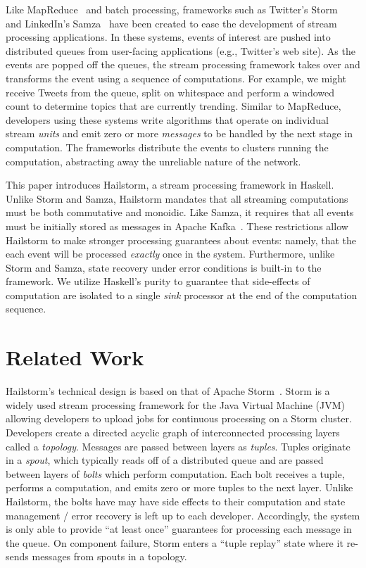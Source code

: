 \documentclass[10pt,nocopyrightspace]{sigplanconf}
\begin{document}
Like MapReduce~\cite{mapreduce} and batch processing, frameworks such as
Twitter's Storm~\cite{storm} and LinkedIn's Samza~\cite{samza} have been
created to ease the development of stream processing applications. In these
systems, events of interest are pushed into distributed queues from user-facing
applications (e.g., Twitter's web site).  As the events are popped off the
queues, the stream processing framework takes over and transforms the event
using a sequence of computations. For example, we might receive Tweets from the
queue, split on whitespace and perform a windowed count to determine topics
that are currently trending. Similar to MapReduce, developers using these
systems write algorithms that operate on individual stream \textit{units} and
emit zero or more \textit{messages} to be handled by the next stage in
computation. The frameworks distribute the events to clusters running the
computation, abstracting away the unreliable nature of the network.

This paper introduces Hailstorm, a stream processing framework in Haskell.
Unlike Storm and Samza, Hailstorm mandates that all streaming computations must
be both commutative and monoidic. Like Samza, it requires that all events must
be initially stored as messages in Apache Kafka~\cite{kafka}.  These
restrictions allow Hailstorm to make stronger processing guarantees about
events: namely, that the each event will be processed \textit{exactly} once in
the system. Furthermore, unlike Storm and Samza, state recovery under error
conditions is built-in to the framework. We utilize Haskell's purity to
guarantee that side-effects of computation are isolated to a single
\textit{sink} processor at the end of the computation sequence.


\section{Related Work}
Hailstorm's technical design is based on that of Apache Storm~\cite{storm}. 
Storm is a widely used stream processing framework for
the Java Virtual Machine (JVM) allowing developers to upload jobs for continuous
processing on a Storm cluster. Developers create a directed acyclic graph of
interconnected processing layers called a \textit{topology}.
Messages are passed between layers as
\textit{tuples}. Tuples originate in a \textit{spout}, which typically reads
off of a distributed queue and are passed between layers of \textit{bolts} which
perform computation. Each bolt receives a tuple, performs a computation, and 
emits zero or more tuples to the next layer. Unlike Hailstorm, the bolts have
may have side effects to their computation and state management / error recovery
is left up to each developer. Accordingly, the system is only able to provide 
``at least once'' guarantees for processing each message in the queue. On
component failure, Storm enters a ``tuple replay'' state where it re-sends
messages from spouts in a topology. 
\end{document}
